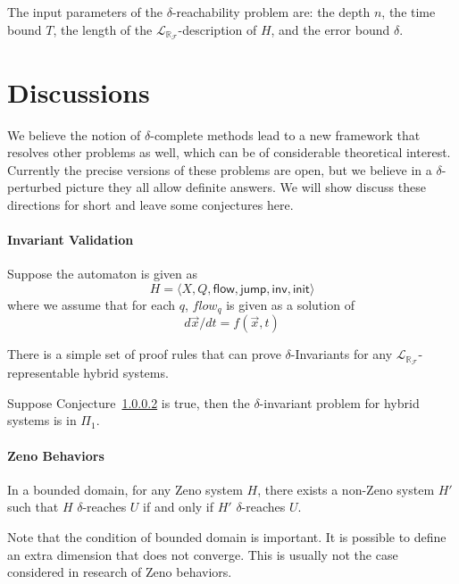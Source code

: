 \documentclass[envcountsect]{llncs}
\newcommand{\flow}{\mathsf{flow}}
\newcommand{\jump}{\mathsf{jump}}
\newcommand{\inv}{\mathsf{inv}}
\newcommand{\init}{\mathsf{init}}
\newcommand{\lrf}{\mathcal{L}_{\mathbb{R}_{\mathcal{F}}}}
\begin{document}
\begin{remark}
The input parameters of the $\delta$-reachability problem are: the depth $n$, the time bound $T$, the length of the $\lrf$-description of $H$, and the error bound $\delta$.
\end{remark}

\section{Discussions}

We believe the notion of $\delta$-complete methods lead to a new framework that
resolves other problems as well, which can be of considerable theoretical
interest. Currently the precise versions of these problems are open, but we
believe in a $\delta$-perturbed picture they all allow definite answers. We
will show discuss these directions for short and leave some conjectures here.

\paragraph{Invariant Validation}
Suppose the automaton is given as
$$H = \langle X, Q, \flow, \jump, \inv, \init \rangle$$
where we assume that for each $q$, $flow_q$ is given as a solution of
$$d\vec x/dt = f(\vec x, t)$$
\begin{definition}

\end{definition}

\begin{conjecture}
 There is a simple set of proof rules that can prove $\delta$-Invariants for
any $\lrf$-representable hybrid systems.
\end{conjecture}

\begin{proposition}
Suppose Conjecture~\ref{} is true, then the $\delta$-invariant problem for
hybrid systems is in $\Pi_1$.
\end{proposition}

\paragraph{Zeno Behaviors}
\begin{conjecture}
In a bounded domain, for any Zeno system $H$, there exists a non-Zeno system
$H'$ such that $H$ $\delta$-reaches $U$ if and only if $H'$ $\delta$-reaches
$U$.
\end{conjecture}
Note that the condition of bounded domain is important. It is possible to
define an extra dimension that does not converge. This is usually not the case
considered in research of Zeno behaviors.
\end{document}
